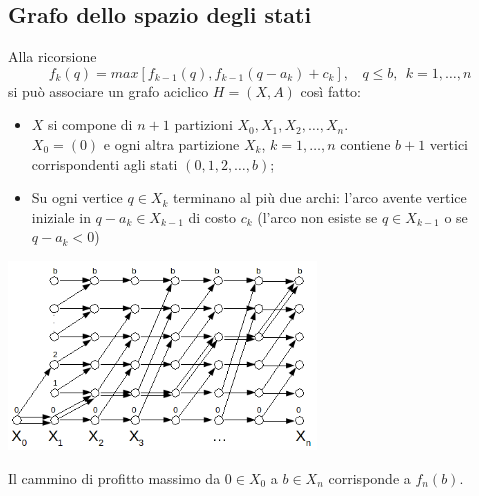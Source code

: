 \subsection{Grafo dello spazio degli stati}
Alla ricorsione
\begin{equation}
	f_{k}(q)=max[f_{k-1}(q),f_{k-1}(q-a_{k})+c_{k}],\ \ \ \ q\le b,\ \ k=1,\dots,n
\end{equation}
si può associare un grafo aciclico $H=(X,A)$ così fatto:
\begin{itemize}
	\item $X$ si compone di $n+1$ partizioni $X_{0},X_{1},X_{2},\dots,X_{n}$.\\
	$X_{0}=(0)$ e ogni altra partizione $X_{k}$, $k=1,\dots,n$ contiene $b+1$ vertici corrispondenti agli stati $(0,1,2,\dots,b)$;
	\item Su ogni vertice $q\in X_{k}$ terminano al più due archi: l'arco avente vertice iniziale in $q-a_{k}\in X_{k-1}$ di costo $c_{k}$ (l'arco non esiste se $q\in X_{k-1}$ o se $q-a_{k}<0$)
\end{itemize}
\centerline{\includegraphics[height=5cm]{images/graph39.png}}
Il cammino di profitto massimo da $0\in X_{0}$ a $b\in X_{n}$ corrisponde a $f_{n}(b)$.
